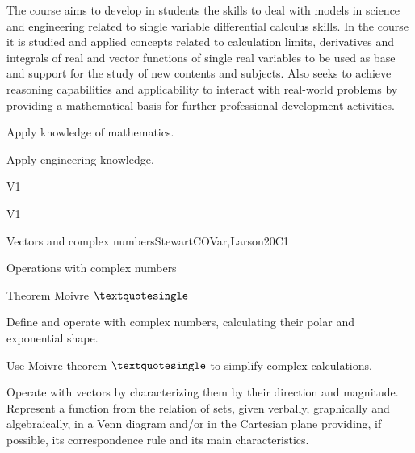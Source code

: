 \begin{syllabus}


\begin{justification}
The course aims to develop in students the skills to deal with models in science and engineering related to single variable differential calculus skills. In the course it is studied and applied concepts related to calculation limits, derivatives and integrals of real and vector functions of single real variables to be used as base and support for the study of new contents and subjects. 
Also seeks to achieve reasoning capabilities and applicability to interact with real-world problems by providing a mathematical basis for further professional development activities.
\end{justification}

\begin{goals}
\item Apply knowledge of mathematics.
\item Apply engineering knowledge.
\end{goals}

\begin{outcomes}{V1}
   \item {}
   \item {}
\end{outcomes}

\begin{competences}{V1}
   \item {}
   \item {}
   \item {}
\end{competences}

\begin{unit}{Vectors and complex numbers}{}{StewartCOVar,Larson}{20}{C1}
   \begin{topics}
      \item Operations with complex numbers
      \item Theorem Moivre $\textquotesingle$
   \end{topics}

   \begin{learningoutcomes}
      \item  Define and operate with complex numbers, calculating their polar and exponential shape.
      \item  Use Moivre theorem $\textquotesingle$ to simplify complex calculations.
      \item Operate with vectors by characterizing them by their direction and magnitude.  Represent a function from the relation of sets, given verbally, graphically and algebraically, in a Venn diagram and/or in the Cartesian plane providing, if possible, its correspondence rule and its main characteristics.
   \end{learningoutcomes}
\end{unit}


\end{syllabus}

